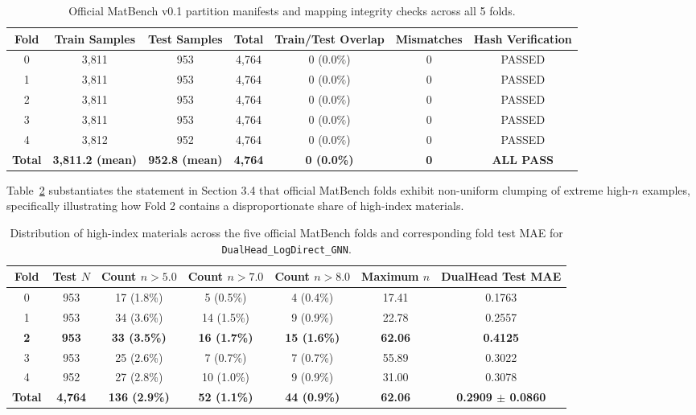 \documentclass[journal,article,submit,moreauthors,pdftex]{article}
\begin{document}
\begin{table}[htbp]
\centering
\caption{Official MatBench v0.1 partition manifests and mapping integrity checks across all 5 folds.}
\label{tab:si_manifests}
\begin{tabular}{ccccccc}
\toprule
\textbf{Fold} & \textbf{Train Samples} & \textbf{Test Samples} & \textbf{Total} & \textbf{Train/Test Overlap} & \textbf{Mismatches} & \textbf{Hash Verification} \\
\midrule
0 & 3,811 & 953 & 4{,}764 & 0 (0.0\%) & 0 & PASSED \\
1 & 3,811 & 953 & 4{,}764 & 0 (0.0\%) & 0 & PASSED \\
2 & 3,811 & 953 & 4{,}764 & 0 (0.0\%) & 0 & PASSED \\
3 & 3,811 & 953 & 4{,}764 & 0 (0.0\%) & 0 & PASSED \\
4 & 3,812 & 952 & 4{,}764 & 0 (0.0\%) & 0 & PASSED \\
\midrule
\textbf{Total} & \textbf{3,811.2 (mean)} & \textbf{952.8 (mean)} & \textbf{4{,}764} & \textbf{0 (0.0\%)} & \textbf{0} & \textbf{ALL PASS} \\
\bottomrule
\end{tabular}
\end{table}

Table~\ref{tab:si_tail_counts} substantiates the statement in Section 3.4 that official MatBench folds exhibit non-uniform clumping of extreme high-$n$ examples, specifically illustrating how Fold 2 contains a disproportionate share of high-index materials.

\begin{table}[htbp]
\centering
\caption{Distribution of high-index materials across the five official MatBench folds and corresponding fold test MAE for \texttt{DualHead\_LogDirect\_GNN}.}
\label{tab:si_tail_counts}
\begin{tabular}{ccccccc}
\toprule
\textbf{Fold} & \textbf{Test $N$} & \textbf{Count $n > 5.0$} & \textbf{Count $n > 7.0$} & \textbf{Count $n > 8.0$} & \textbf{Maximum $n$} & \textbf{DualHead Test MAE} \\
\midrule
0 & 953 & 17 (1.8\%) & 5 (0.5\%) & 4 (0.4\%) & 17.41 & 0.1763 \\
1 & 953 & 34 (3.6\%) & 14 (1.5\%) & 9 (0.9\%) & 22.78 & 0.2557 \\
\textbf{2} & \textbf{953} & \textbf{33 (3.5\%)} & \textbf{16 (1.7\%)} & \textbf{15 (1.6\%)} & \textbf{62.06} & \textbf{0.4125} \\
3 & 953 & 25 (2.6\%) & 7 (0.7\%) & 7 (0.7\%) & 55.89 & 0.3022 \\
4 & 952 & 27 (2.8\%) & 10 (1.0\%) & 9 (0.9\%) & 31.00 & 0.3078 \\
\midrule
\textbf{Total} & \textbf{4{,}764} & \textbf{136 (2.9\%)} & \textbf{52 (1.1\%)} & \textbf{44 (0.9\%)} & \textbf{62.06} & \textbf{0.2909 $\pm$ 0.0860} \\
\bottomrule
\end{tabular}
\end{table}
\end{document}
